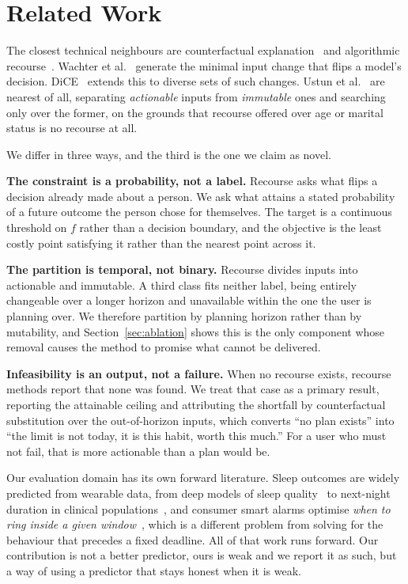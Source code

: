 \documentclass[conference]{IEEEtran}
\begin{document}
\section{Related Work}
\label{sec:related}

The closest technical neighbours are counterfactual explanation~\cite{wachter}
and algorithmic recourse~\cite{ustun,dice}. Wachter et al.~\cite{wachter}
generate the minimal input change that flips a model's decision.
DiCE~\cite{dice} extends this to diverse sets of such changes. Ustun et
al.~\cite{ustun} are nearest of all, separating \emph{actionable} inputs from
\emph{immutable} ones and searching only over the former, on the grounds that
recourse offered over age or marital status is no recourse at all.

We differ in three ways, and the third is the one we claim as novel.

\textbf{The constraint is a probability, not a label.} Recourse asks what flips
a decision already made about a person. We ask what attains a stated probability
of a future outcome the person chose for themselves. The target is a continuous
threshold on $f$ rather than a decision boundary, and the objective is the least
costly point satisfying it rather than the nearest point across it.

\textbf{The partition is temporal, not binary.} Recourse divides inputs into
actionable and immutable. A third class fits neither label, being entirely
changeable over a longer horizon and unavailable within the one the user is
planning over. We therefore partition by planning horizon rather than by
mutability, and Section~\ref{sec:ablation} shows this is the only component
whose removal causes the method to promise what cannot be delivered.

\textbf{Infeasibility is an output, not a failure.} When no recourse exists,
recourse methods report that none was found. We treat that case as a primary
result, reporting the attainable ceiling and attributing the shortfall by
counterfactual substitution over the out-of-horizon inputs, which converts ``no
plan exists'' into ``the limit is not today, it is this habit, worth this much.''
For a user who must not fail, that is more actionable than a plan would be.

Our evaluation domain has its own forward literature. Sleep outcomes are widely
predicted from wearable data, from deep models of sleep
quality~\cite{sathya} to next-night duration in clinical
populations~\cite{fellger}, and consumer smart alarms optimise \emph{when to
ring inside a given window}~\cite{smartalarm}, which is a different problem from
solving for the behaviour that precedes a fixed deadline. All of that work runs
forward. Our contribution is not a better predictor, ours is weak and we report
it as such, but a way of using a predictor that stays honest when it is weak.
\end{document}
